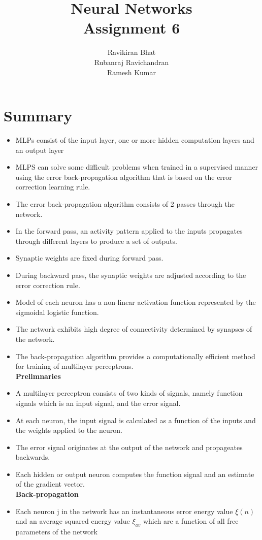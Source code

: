 \documentclass[12pt]{article}
\title{\Huge Neural Networks \\
[6mm]
Assignment 6\\}
\author{Ravikiran Bhat\\
Rubanraj Ravichandran\\
Ramesh Kumar}
\begin{document}
\maketitle
\newpage
\section{Summary}
\begin{itemize}
\item MLPs consist of the input layer, one or more hidden computation layers and an output layer
\item MLPS can solve some difficult problems when trained in a supervised manner using the error back-propagation algorithm that is based on the error correction learning rule.
\item The error back-propagation algorithm consists of 2 passes through the network.
\item In the forward pass, an activity pattern applied to the inputs propagates through different layers to produce a set of outputs.
\item Synaptic weights are fixed during forward pass.
\item During backward pass, the synaptic weights are adjusted according to the error correction rule.
\item Model of each neuron has a non-linear activation function represented by the sigmoidal logistic function.
\item The network exhibits high degree of connectivity determined by synapses of the network.
\item The back-propagation algorithm provides a computationally efficient method for training of multilayer perceptrons.\\
[2mm]
\textbf{Prelimnaries}
\item A multilayer perceptron consists of two kinds of signals, namely function signals which is an input signal, and the error signal.
\item At each neuron, the input signal is calculated as a function of the inputs and the weights applied to the neuron.
\item The error signal originates at the output of the network and propageates backwards.
\item Each hidden or output neuron computes the function signal and an estimate of the gradient vector.\\
[2mm]
\newpage
\textbf{Back-propagation}
\item Each neuron j in the network has an instantaneous error energy value $\xi (n)$ and an average squared energy value $\xi_{av}$ which are a function of all free parameters of the network

\end{itemize}
\end{document}
